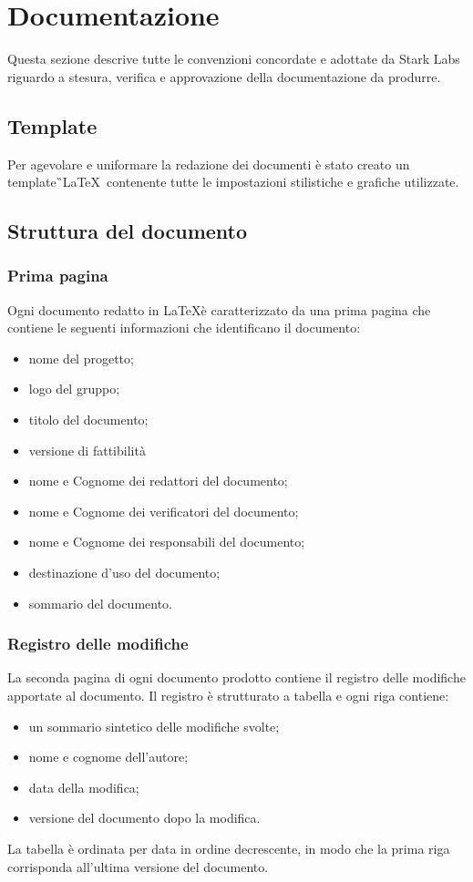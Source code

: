 \section{Documentazione}
Questa sezione descrive tutte le convenzioni concordate e adottate da Stark 
Labs riguardo a stesura, verifica e approvazione della
documentazione da produrre.

\subsection{Template}
Per agevolare e uniformare la redazione dei documenti è stato creato un 
template\G\ \LaTeX\ contenente tutte le impostazioni stilistiche e 
grafiche utilizzate.

\subsection{Struttura del documento}
\subsubsection{Prima pagina}
Ogni documento redatto in \LaTeX è caratterizzato da una prima pagina che 
contiene le seguenti informazioni che identificano il documento:
\begin{itemize}
	\item nome del progetto;
	\item logo del gruppo;
	\item titolo del documento;
	\item versione di fattibilità
	\item nome e Cognome dei redattori del documento;
	\item nome e Cognome dei verificatori del documento;
	\item nome e Cognome dei responsabili del documento;
	\item destinazione d'uso del documento;
	\item sommario del documento.
\end{itemize}

\subsubsection{Registro delle modifiche}
La seconda pagina di ogni documento prodotto contiene il registro delle modifiche apportate
al documento. Il registro è strutturato a tabella e ogni riga contiene:
\begin{itemize}
	\item un sommario sintetico delle modifiche svolte;
	\item nome e cognome dell'autore;
	\item data della modifica;
	\item versione del documento dopo la modifica.
\end{itemize}
La tabella è ordinata per data in ordine decrescente, in modo che la prima riga 
corrisponda all'ultima versione del documento.

